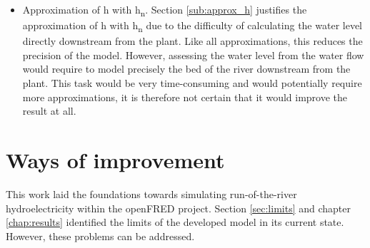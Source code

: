 \begin{itemize}
 \item Approximation of h with h\textsubscript{n}. Section \ref{sub:approx_h} justifies the approximation of h with h\textsubscript{n} due to the difficulty of calculating the water level directly downstream from the plant.  Like all approximations, this reduces the precision of the model. However, assessing the water level from the water flow would require to model precisely the bed of the river downstream from the plant. This task would be very time-consuming and would potentially require more approximations, it is therefore not certain that it would improve the result at all.
\end{itemize}


\section{Ways of improvement}
\label{sec:improv}

This work laid the foundations towards simulating run-of-the-river hydroelectricity within the openFRED project. Section \ref{sec:limits} and chapter \ref{chap:results} identified the limits of the developed model in its current state. However, these problems can be addressed.

